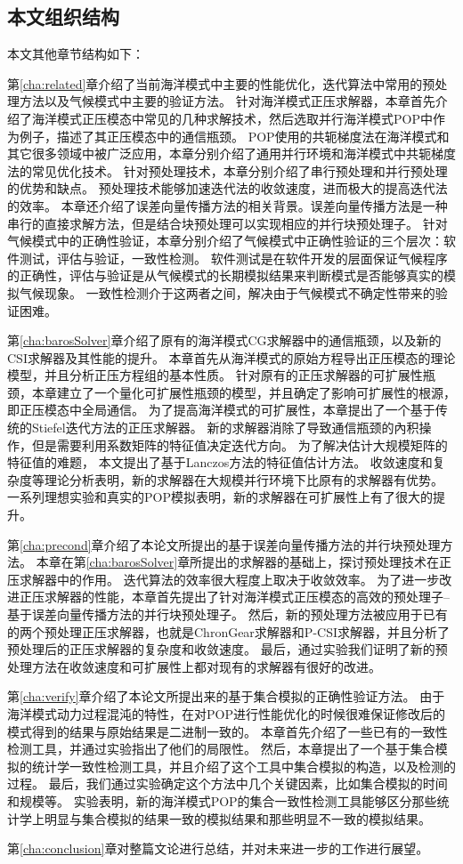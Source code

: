 \subsection{本文组织结构}
本文其他章节结构如下：

第\ref{cha:related}章介绍了当前海洋模式中主要的性能优化，迭代算法中常用的预处理方法以及气候模式中主要的验证方法。
针对海洋模式正压求解器，本章首先介绍了海洋模式正压模态中常见的几种求解技术，然后选取并行海洋模式POP中作为例子，描述了其正压模态中的通信瓶颈。 
POP使用的共轭梯度法在海洋模式和其它很多领域中被广泛应用，本章分别介绍了通用并行环境和海洋模式中共轭梯度法的常见优化技术。
针对预处理技术，本章分别介绍了串行预处理和并行预处理的优势和缺点。
预处理技术能够加速迭代法的收敛速度，进而极大的提高迭代法的效率。
本章还介绍了误差向量传播方法的相关背景。误差向量传播方法是一种串行的直接求解方法，但是结合块预处理可以实现相应的并行块预处理子。
针对气候模式中的正确性验证，本章分别介绍了气候模式中正确性验证的三个层次：软件测试，评估与验证，一致性检测。
软件测试是在软件开发的层面保证气候程序的正确性，评估与验证是从气候模式的长期模拟结果来判断模式是否能够真实的模拟气候现象。
一致性检测介于这两者之间，解决由于气候模式不确定性带来的验证困难。


第\ref{cha:barosSolver}章介绍了原有的海洋模式CG求解器中的通信瓶颈，以及新的CSI求解器及其性能的提升。 
本章首先从海洋模式的原始方程导出正压模态的理论模型，并且分析正压方程组的基本性质。
针对原有的正压求解器的可扩展性瓶颈，本章建立了一个量化可扩展性瓶颈的模型，并且确定了影响可扩展性的根源，即正压模态中全局通信。
为了提高海洋模式的可扩展性，本章提出了一个基于传统的Stiefel迭代方法的正压求解器。 
新的求解器消除了导致通信瓶颈的內积操作，但是需要利用系数矩阵的特征值决定迭代方向。 
为了解决估计大规模矩阵的特征值的难题， 本文提出了基于Lanczos方法的特征值估计方法。 
收敛速度和复杂度等理论分析表明，新的求解器在大规模并行环境下比原有的求解器有优势。
一系列理想实验和真实的POP模拟表明，新的求解器在可扩展性上有了很大的提升。 



第\ref{cha:precond}章介绍了本论文所提出的基于误差向量传播方法的并行块预处理方法。
本章在第\ref{cha:barosSolver}章所提出的求解器的基础上，探讨预处理技术在正压求解器中的作用。
迭代算法的效率很大程度上取决于收敛效率。
为了进一步改进正压求解器的性能，本章首先提出了针对海洋模式正压模态的高效的预处理子--基于误差向量传播方法的并行块预处理子。
然后，新的预处理方法被应用于已有的两个预处理正压求解器，也就是ChronGear求解器和P-CSI求解器，并且分析了预处理后的正压求解器的复杂度和收敛速度。
最后，通过实验我们证明了新的预处理方法在收敛速度和可扩展性上都对现有的求解器有很好的改进。

第\ref{cha:verify}章介绍了本论文所提出来的基于集合模拟的正确性验证方法。  
由于海洋模式动力过程混沌的特性，在对POP进行性能优化的时候很难保证修改后的模式得到的结果与原始结果是二进制一致的。 
本章首先介绍了一些已有的一致性检测工具，并通过实验指出了他们的局限性。
然后，本章提出了一个基于集合模拟的统计学一致性检测工具，并且介绍了这个工具中集合模拟的构造，以及检测的过程。
最后，我们通过实验确定这个方法中几个关键因素，比如集合模拟的时间和规模等。
实验表明，新的海洋模式POP的集合一致性检测工具能够区分那些统计学上明显与集合模拟的结果一致的模拟结果和那些明显不一致的模拟结果。 


第\ref{cha:conclusion}章对整篇文论进行总结，并对未来进一步的工作进行展望。


